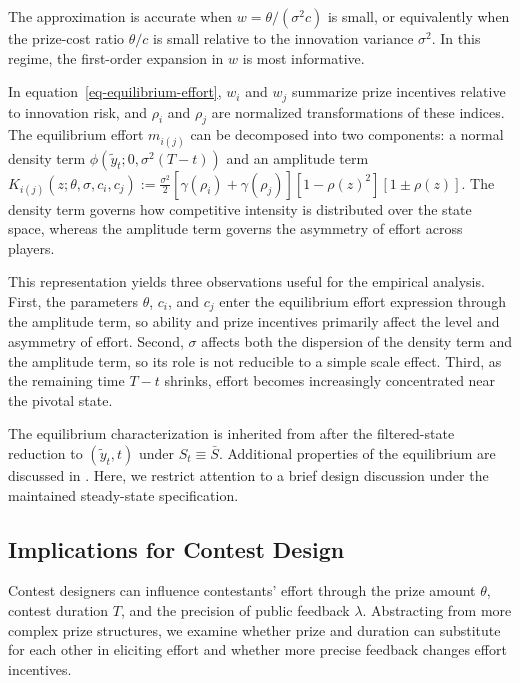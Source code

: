 \documentclass[mnsc]{informs3}
\begin{document}
\begin{remark}
The approximation is accurate when \(w=\theta/(\sigma^2c)\) is small, or equivalently when the prize-cost ratio \(\theta/c\) is small relative to the innovation variance \(\sigma^2\). 
In this regime, the first-order expansion in \(w\) is most informative.
\end{remark}

In equation~\eqref{eq-equilibrium-effort}, $w_i$ and $w_j$ summarize prize incentives relative to innovation risk, and $\rho_i$ and $\rho_j$ are normalized transformations of these indices.
The equilibrium effort $m_{i(j)}$ can be decomposed into two components: a normal density term $\phi(\tilde{y}_t; 0, \sigma^2(T-t))$ and an amplitude term $K_{i(j)}(z;\theta,\sigma,c_i,c_j)
:= \frac{\sigma^2}{2}\left[\gamma(\rho_i)+\gamma(\rho_j)\right]\left[1-\rho(z)^2\right]\left[1\pm\rho(z)\right]$.
The density term governs how competitive intensity is distributed over the state space, whereas the amplitude term governs the asymmetry of effort across players.

This representation yields three observations useful for the empirical analysis.
First, the parameters $\theta$, $c_i$, and $c_j$ enter the equilibrium effort expression through the amplitude term, so ability and prize incentives primarily affect the level and asymmetry of effort.
Second, $\sigma$ affects both the dispersion of the density term and the amplitude term, so its role is not reducible to a simple scale effect.
Third, as the remaining time $T-t$ shrinks, effort becomes increasingly concentrated near the pivotal state.

The equilibrium characterization is inherited from \citet{Ryvkin2022Fight} after the filtered-state reduction to $(\tilde y_t,t)$ under $S_t\equiv\bar S$.
Additional properties of the equilibrium are discussed in \citet{Ryvkin2022Fight}.
Here, we restrict attention to a brief design discussion under the maintained steady-state specification.



\subsection{Implications for Contest Design}\label{sect-design}

Contest designers can influence contestants’ effort through the prize amount \(\theta\), contest duration \(T\), and the precision of public feedback \(\lambda\). 
Abstracting from more complex prize structures, we examine whether prize and duration can substitute for each other in eliciting effort and whether more precise feedback changes effort incentives.
\end{document}

